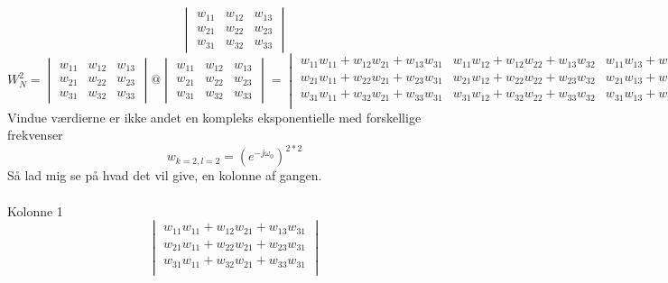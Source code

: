 \begin{Opgaver}
\begin{kapitel}
\begin{Opgave}
\begin{UnderOpgave}
\[\begin{vmatrix}
                        w_{11} & w_{12} & w_{13} \\
                        w_{21} & w_{22} & w_{23} \\
                        w_{31} & w_{32} & w_{33}  
                    \end{vmatrix}
                \]
                \[ W_N^2  = 
                    \begin{vmatrix}
                        w_{11} & w_{12} & w_{13} \\
                        w_{21} & w_{22} & w_{23} \\
                        w_{31} & w_{32} & w_{33}  
                    \end{vmatrix}
                    @ 
                    \begin{vmatrix}
                        w_{11} & w_{12} & w_{13} \\
                        w_{21} & w_{22} & w_{23} \\
                        w_{31} & w_{32} & w_{33}  
                    \end{vmatrix}
                    = 
                    \begin{vmatrix}
                        w_{11}w_{11} + w_{12}w_{21} +w_{13}w_{31} & w_{11}w_{12} + w_{12}w_{22} +w_{13}w_{32} & w_{11}w_{13} + w_{13}w_{23} +w_{13}w_{33} \\
                        w_{21}w_{11} + w_{22}w_{21} +w_{23}w_{31} & w_{21}w_{12} + w_{22}w_{22} +w_{23}w_{32} & w_{21}w_{13} + w_{23}w_{23} +w_{23}w_{33} \\
                        w_{31}w_{11} + w_{32}w_{21} +w_{33}w_{31} & w_{31}w_{12} + w_{32}w_{22} +w_{33}w_{32} & w_{31}w_{13} + w_{33}w_{23} +w_{33}w_{33} \\ 
                    \end{vmatrix}
                \]
                Vindue værdierne er ikke andet en kompleks eksponentielle med forskellige frekvenser 
                \[w_{k = 2, l = 2} = (e^{-j\omega_0})^{2*2}\]
                Så lad mig se på hvad det vil give, en kolonne af gangen.\\\\
                Kolonne 1 
                \[\begin{vmatrix}
                    w_{11}w_{11} + w_{12}w_{21} +w_{13}w_{31} \\
                    w_{21}w_{11} + w_{22}w_{21} +w_{23}w_{31} \\
                    w_{31}w_{11} + w_{32}w_{21} +w_{33}w_{31} \\

\end{vmatrix}\]
\end{UnderOpgave}
\end{Opgave}
\end{kapitel}
\end{Opgaver}
